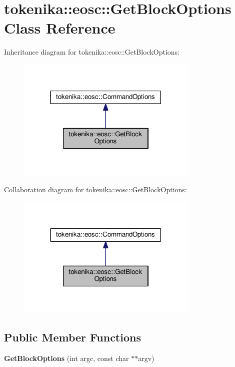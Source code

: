 \hypertarget{classtokenika_1_1eosc_1_1_get_block_options}{}\section{tokenika\+:\+:eosc\+:\+:Get\+Block\+Options Class Reference}
\label{classtokenika_1_1eosc_1_1_get_block_options}


Inheritance diagram for tokenika\+:\+:eosc\+:\+:Get\+Block\+Options\+:\nopagebreak
\begin{figure}[H]
\begin{center}
\leavevmode
\includegraphics[width=245pt]{classtokenika_1_1eosc_1_1_get_block_options__inherit__graph}
\end{center}
\end{figure}


Collaboration diagram for tokenika\+:\+:eosc\+:\+:Get\+Block\+Options\+:\nopagebreak
\begin{figure}[H]
\begin{center}
\leavevmode
\includegraphics[width=245pt]{classtokenika_1_1eosc_1_1_get_block_options__coll__graph}
\end{center}
\end{figure}
\subsection*{Public Member Functions}
\begin{DoxyCompactItemize}
\item 
\mbox{\label{classtokenika_1_1eosc_1_1_get_block_options_ab031795a5bd5cf681307cc9ea07659a3}} 
{\bfseries Get\+Block\+Options} (int argc, const char $\ast$$\ast$argv)
\end{DoxyCompactItemize}
